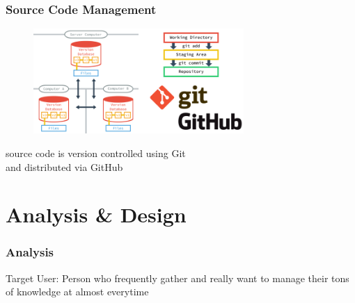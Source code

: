 \documentclass[10pt, compress]{beamer}
\begin{document}

\begin{frame}[fragile]
  \frametitle{Source Code Management}
  \centering

  \begin{figure}[ht]
    \includegraphics[width=8cm]{include/literature-scm.png}
  \end{figure}

  source code is version controlled using \alert{Git}\\
  and distributed via \alert{GitHub}

\end{frame}


\section{Analysis \& Design}


\begin{frame}[fragile]
  \frametitle{Analysis}

    \begin{block}{Target User:}
      Person who frequently gather and really want to manage their tons of knowledge at almost everytime
    \end{block}

\end{frame}

\end{document}

